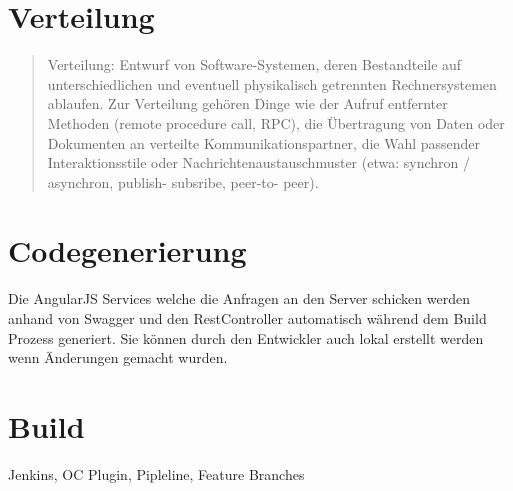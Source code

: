 \section{Verteilung}

\begin{quote}
	Verteilung: Entwurf von Software-Systemen, deren Bestandteile auf unterschiedlichen und eventuell physikalisch getrennten Rechnersystemen ablaufen.
	Zur Verteilung gehören Dinge wie der Aufruf entfernter Methoden (remote procedure call, RPC), die Übertragung von Daten oder Dokumenten an verteilte Kommunikationspartner, die Wahl passender Interaktionsstile oder Nachrichtenaustauschmuster (etwa: synchron / asynchron, publish- subsribe, peer-to- peer).
\end{quote}

\section{Codegenerierung}

Die AngularJS Services welche die Anfragen an den Server schicken werden anhand von Swagger und den RestController automatisch während dem Build Prozess generiert. Sie können durch den Entwickler auch lokal erstellt werden wenn Änderungen gemacht wurden.

\section{Build}

Jenkins, OC Plugin, Pipleline, Feature Branches